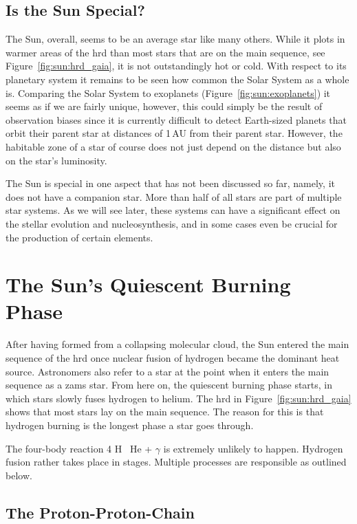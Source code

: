 \subsection{Is the Sun Special?}

The Sun, overall, seems to be an average star like many others. While it plots in warmer areas of the \ac{hrd} than most stars that are on the main sequence, see Figure~\ref{fig:sun:hrd_gaia}, it is not outstandingly hot or cold. With respect to its planetary system it remains to be seen how common the Solar System as a whole is. Comparing the Solar System to exoplanets (Figure~\ref{fig:sun:exoplanets}) it seems as if we are fairly unique, however, this could simply be the result of observation biases since it is currently difficult to detect Earth-sized planets that orbit their parent star at distances of 1\,AU from their parent star. However, the habitable zone of a star of course does not just depend on the distance but also on the star's luminosity. 

The Sun is special in one aspect that has not been discussed so far, namely, it does not have a companion star. More than half of all stars are part of multiple star systems. As we will see later, these systems can have a significant effect on the stellar evolution and nucleosynthesis, and in some cases even be crucial for the production of certain elements.



\section{The Sun's Quiescent Burning Phase}

After having formed from a collapsing molecular cloud, the Sun entered the main sequence of the \ac{hrd} once nuclear fusion of hydrogen became the dominant heat source. Astronomers also refer to a star at the point when it enters the main sequence as a \ac{zams} star. From here on, the quiescent burning phase starts, in which stars slowly fuses hydrogen to helium. The \ac{hrd} in Figure~\ref{fig:sun:hrd_gaia} shows that most stars lay on the main sequence. The reason for this is that hydrogen burning is the longest phase a star goes through.

The four-body reaction 4 H \textrightarrow\ He + $\gamma$ is extremely unlikely to happen. Hydrogen fusion rather takes place in stages. Multiple processes are responsible as outlined below.

\subsection{The Proton-Proton-Chain}

